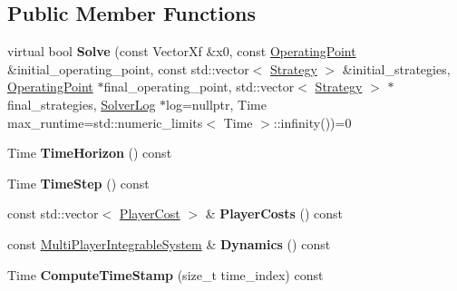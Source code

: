 \subsection*{Public Member Functions}
\begin{DoxyCompactItemize}
\item 
virtual bool {\bfseries Solve} (const Vector\+Xf \&x0, const \hyperlink{structilqgames_1_1_operating_point}{Operating\+Point} \&initial\+\_\+operating\+\_\+point, const std\+::vector$<$ \hyperlink{structilqgames_1_1_strategy}{Strategy} $>$ \&initial\+\_\+strategies, \hyperlink{structilqgames_1_1_operating_point}{Operating\+Point} $\ast$final\+\_\+operating\+\_\+point, std\+::vector$<$ \hyperlink{structilqgames_1_1_strategy}{Strategy} $>$ $\ast$final\+\_\+strategies, \hyperlink{classilqgames_1_1_solver_log}{Solver\+Log} $\ast$log=nullptr, Time max\+\_\+runtime=std\+::numeric\+\_\+limits$<$ Time $>$\+::infinity())=0\hypertarget{classilqgames_1_1_game_solver_a04a24078cb14f0bf176406bb420a06b3}{}\label{classilqgames_1_1_game_solver_a04a24078cb14f0bf176406bb420a06b3}

\item 
Time {\bfseries Time\+Horizon} () const \hypertarget{classilqgames_1_1_game_solver_a9fa5328990bd8139c556c09453020e33}{}\label{classilqgames_1_1_game_solver_a9fa5328990bd8139c556c09453020e33}

\item 
Time {\bfseries Time\+Step} () const \hypertarget{classilqgames_1_1_game_solver_a113252da6aa43d0beb9966277653af04}{}\label{classilqgames_1_1_game_solver_a113252da6aa43d0beb9966277653af04}

\item 
const std\+::vector$<$ \hyperlink{classilqgames_1_1_player_cost}{Player\+Cost} $>$ \& {\bfseries Player\+Costs} () const \hypertarget{classilqgames_1_1_game_solver_afe05eb1238b481b82747f9edf005c301}{}\label{classilqgames_1_1_game_solver_afe05eb1238b481b82747f9edf005c301}

\item 
const \hyperlink{classilqgames_1_1_multi_player_integrable_system}{Multi\+Player\+Integrable\+System} \& {\bfseries Dynamics} () const \hypertarget{classilqgames_1_1_game_solver_aa0917153345988be1661fca76a6f8500}{}\label{classilqgames_1_1_game_solver_aa0917153345988be1661fca76a6f8500}

\item 
Time {\bfseries Compute\+Time\+Stamp} (size\+\_\+t time\+\_\+index) const \hypertarget{classilqgames_1_1_game_solver_a490b20711d5d698171620f5bce607027}{}\label{classilqgames_1_1_game_solver_a490b20711d5d698171620f5bce607027}

\end{DoxyCompactItemize}
